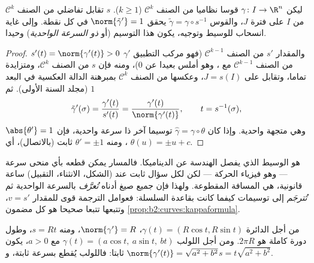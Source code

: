 \begin{theorem}\label{thm:b2:curves:arclength}
ليكن $\gamma \colon I \to \R^n$ قوسا نظاميا من الصنف $\mathcal{C}^k$ ($k \geq 1$). 
$s$ تقابل تفاضلي من الصنف $\mathcal{C}^k$ من $I$ على فترة $J$، والقوس
$\tilde\gamma =
\gamma \circ s^{-1}$ يحقق $\norm{\tilde\gamma'} = 1$ في كل نقطة. وإلى غاية انسحاب للوسيط وتوجيه، يكون
هذا التوسيم \emph{} (أو \emph{ذو السرعة الواحدية}) وحيدا.
\end{theorem}

\begin{proof}
$s'(t) = \norm{\gamma'(t)} > 0$ والمقدار $s'$ من الصنف $\mathcal{C}^{k-1}$ (فهو مركب التطبيق $\gamma'$ من
الصنف $\mathcal{C}^{k-1}$ مع ، وهو أملس بعيدا عن $0$)، ومنه فإن $s$
من الصنف $\mathcal{C}^k$، ومتزايدة تماما، وتقابل على $J = s(I)$، وعكسها من الصنف
$\mathcal{C}^k$ بمبرهنة الدالة العكسية في البعد $1$ (مجلد السنة الأولى).
ثم
\[
\tilde\gamma'(\sigma)
= \frac{\gamma'(t)}{s'(t)}
= \frac{\gamma'(t)}{\norm{\gamma'(t)}},
\qquad t = s^{-1}(\sigma),
\]
وهي متجهة واحدية. وإذا كان $\hat\gamma = \gamma\circ\theta$ توسيما آخر ذا سرعة واحدية، فإن
$\abs{\theta'} = 1$، ومنه $\theta'
= \pm 1$ ثابت (بالاتصال)، أي $\theta(u) = \pm u + c$.
\end{proof}

\begin{remark}
 هو الوسيط الذي يفصل الهندسة عن الديناميكا. فالمسار يمكن
قطعه بأي منحى سرعة --- وهو فيزياء الحركة --- لكن لكل سؤال ثابت عند
 (الشكل، الانثناء، التقبيل) ساعة قانونية، هي المسافة
المقطوعة. ولهذا فإن جميع صيغ  أدناه \emph{تُعرَّف} بالسرعة
الواحدية ثم \emph{تُترجَم} إلى توسيمات كيفما كانت بقاعدة السلسلة:
فعوامل الترجمة قوى للمقدار $v = s'$، وتتبعها تتبعا صحيحا هو كل مضمون
\cref{prop:b2:curves:kappaformula}.
\end{remark}

\begin{example}\label{ex:b2:curves:helix}
من أجل الدائرة $\gamma(t) = (R\cos t, R\sin t)$، $\norm{\gamma'} =
R$، ومنه $s = Rt$، وطول دورة كاملة هو
$2\pi R$. ومن أجل اللولب $\gamma(t) = (a\cos t,\ a\sin t,\ bt)$ مع $a > 0$، يكون $\norm{\gamma'(t)} = \sqrt{a^2 + b^2}$ ثابتا: فاللولب
يُقطع بسرعة ثابتة، و$s = t\sqrt{a^2 + b^2}$.
\end{example}

